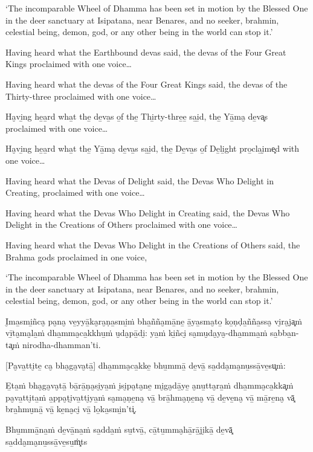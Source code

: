 ‘The incomparable Wheel of Dhamma has been set in motion by the Blessed
One in the deer sanctuary at Isipatana, near Benares, and no seeker,
brahmin, celestial being, demon, god, or any other being in the world
can stop it.’

Having heard what the Earthbound devas said, the devas of the Four Great
Kings proclaimed with one voice\ldots

Having heard what the devas of the Four Great Kings said, the devas of
the Thirty-three proclaimed with one voice\ldots

Ha̮vi̱ng he̱a̱rd wha̱t the̱ de̱va̱s o̱f the̱ Thi̱rty-thre̱e̱ sa̱i̱d, the̱ Yā̱ma̮ de̱va͓s
proclaimed with one voice\ldots

Ha̮vi̱ng he̱a̱rd wha̱t the̱ Yā̱ma̮ de̱va̱s sa̱i̱d, the̱ De̱va̱s o̱f De̱li̱ght pro̱cla̱i̮me͓d
with one voice\ldots

Having heard what the Devas of Delight said, the Devas Who Delight in
Creating, proclaimed with one voice\ldots

Having heard what the Devas Who Delight in Creating said, the Devas Who
Delight in the Creations of Others proclaimed with one voice\ldots

Having heard what the Devas Who Delight in the Creations of Others said,
the Brahma gods proclaimed in one voice,

‘The incomparable Wheel of Dhamma has been set in motion by the Blessed
One in the deer sanctuary at Isipatana, near Benares, and no seeker,
brahmin, celestial being, demon, god, or any other being in the world
can stop it.’

\clearpage

\paliText
\markboth{\paliTitle}{\rightmark}

I̮ma̱smi̱ñca̮ pa̮na̮ ve̱yyā̱ka̮ra̮ṇa̱smi̱ṁ bha̱ñña̮mā̱ne̱ ā̱ya̱sma̮to̱ ko̱ṇḍa̱ñña̱ssa̮ vi̮ra̮ja͓ṁ
vī̱ta̮ma̮la̱ṁ dha̱mma̮ca̱kkhu̱ṁ u̮da̮pā̱di̮: ya̱ṁ ki̱ñci̮ sa̮mu̮da̮ya̮-dha̱mma̱ṁ sa̱bba̱n-ta͓ṁ
nirodha-dhamman'ti.

[Pa̮va̱tti̮te̱ ca̮ bha̮ga̮va̮tā̱] dha̱mma̮ca̱kke̱ bhu̱mmā̱ de̱vā̱ sa̱dda̮ma̮nu̱ssā̱ve̱su͓ṁ:

E̱ta̱ṁ bha̮ga̮va̮tā̱ bā̱rā̱ṇa̮si̮ya̱ṁ i̮si̮pa̮ta̮ne̱ mi̮ga̮dā̱ye̱ a̮nu̱tta̮ra̱ṁ dha̱mma̮ca̱kka͓ṁ
pa̮va̱tti̮ta̱ṁ a̱ppa̮ṭi̮va̱tti̮ya̱ṁ sa̮ma̮ṇe̱na̮ vā̱ brā̱hma̮ṇe̱na̮ vā̱ de̱ve̱na̮ vā̱ mā̱re̱na̮ vā͓
bra̱hmu̮nā̱ vā̱ ke̱na̮ci̮ vā̱ lo̱ka̱smi̱n'ti͓.

Bhu̱mmā̱na̱ṁ de̱vā̱na̱ṁ sa̱dda̱ṁ su̱tvā̱, cā̱tu̱mma̮hā̱rā̱ji̮kā̱ de̱vā͓
sa̱dda̮ma̮nu̱ssā̱ve̱su̱ṁ\ldo͓ts

